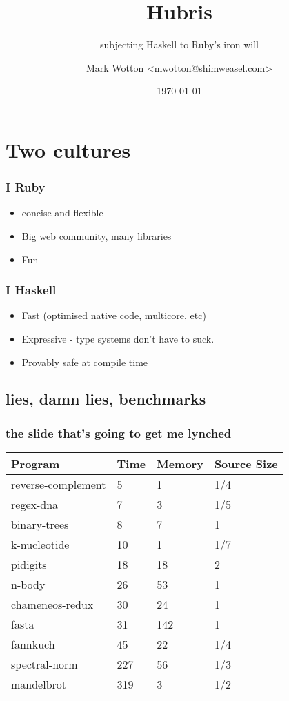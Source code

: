 \documentclass{beamer}
\title{Hubris}
\subtitle{subjecting Haskell to Ruby's iron will}
\author{Mark Wotton \textless mwotton@shimweasel.com\textgreater}
\date{\today}
\begin{document}
\lstset{language=Haskell}
\section{Two cultures}
\frame{\titlepage}

\begin{frame}
  \frametitle{I  Ruby}
  \begin{itemize}
  \item concise and flexible
  \item Big web community, many libraries
  \item Fun
  \end{itemize}
\end{frame}



\begin{frame}
  \frametitle{I  Haskell}
  \begin{itemize}
  \item<1-> Fast (optimised native code, multicore, etc)
  \item<2-> Expressive - type systems don't have to suck.
  \item<3-> Provably safe at compile time
  \end{itemize}
\end{frame}


\subsection{lies, damn lies, benchmarks}
\begin{frame}
  \frametitle{the slide that's going to get me lynched}
  \begin{tabular}{l l l l}
    Program &	        Time	&Memory &	Source Size\\ \hline
    reverse-complement	&5	&1	&1/4\\
    regex-dna	        &7	&3	&1/5\\
    binary-trees	        &8	&7	&1	\\
    k-nucleotide	        &10	&1	&1/7	\\
    pidigits	        &18	&18	&2	\\
    n-body	        &26	&53	&1	\\
    chameneos-redux	&30	&24	&1	\\
    fasta	                &31	&142	&1	\\
    fannkuch	        &45	&22	&1/4	\\
    spectral-norm	        &227	&56	&1/3	\\
    mandelbrot	        &319	&3	&1/2\\
  \end{tabular}
\end{frame}
\end{document}
